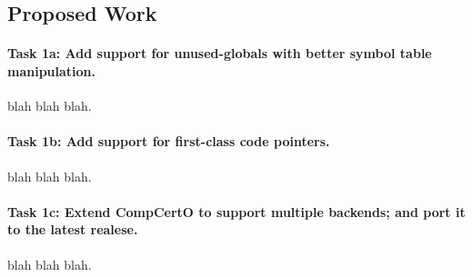 %
%




\subsection{Proposed Work}

\paragraph*{Task 1a: Add support for unused-globals with better symbol table manipulation.}
blah blah blah.

\paragraph*{Task 1b: Add support for first-class code pointers.}
blah blah blah.

\paragraph*{Task 1c: Extend CompCertO to support multiple backends; and port it to the latest realese.}
blah blah blah.
